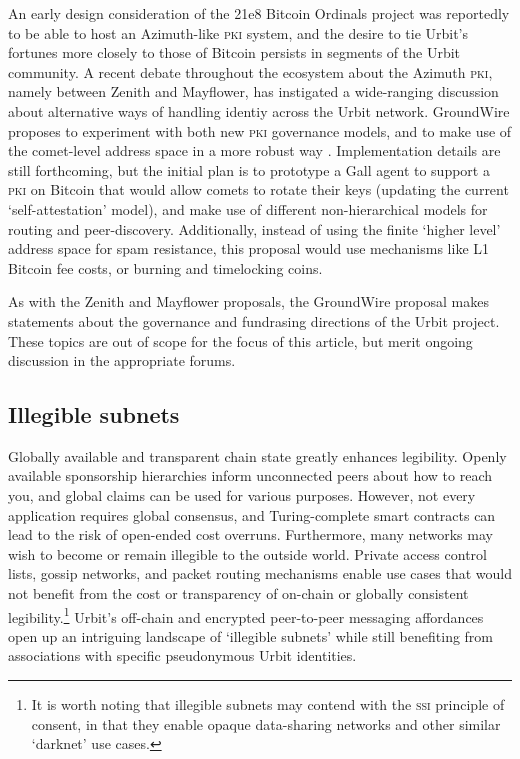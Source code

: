 \documentclass[twoside]{article}
\begin{document}
An early design consideration of the 21e8 Bitcoin Ordinals project \citep{Ordinals} was reportedly to be able to host an Azimuth-like \textsc{pki} system, and the desire to tie Urbit's fortunes more closely to those of Bitcoin persists in segments of the Urbit community. A recent debate throughout the ecosystem about the Azimuth \textsc{pki}, namely between Zenith and Mayflower, has instigated a wide-ranging discussion about alternative ways of handling identiy across the Urbit network. GroundWire proposes to experiment with both new \textsc{pki} governance models, and to make use of the comet-level address space in a more robust way \citep{Hamilton2024}. Implementation details are still forthcoming, but the initial plan is to prototype a Gall agent to support a \textsc{pki} on Bitcoin that would allow comets to rotate their keys (updating the current `self-attestation' model), and make use of different non-hierarchical models for routing and peer-discovery. Additionally, instead of using the finite `higher level' address space for spam resistance, this proposal would use mechanisms like L1 Bitcoin fee costs, or burning and timelocking coins.

As with the Zenith and Mayflower proposals, the GroundWire proposal makes statements about the governance and fundrasing directions of the Urbit project. These topics are out of scope for the focus of this article, but merit ongoing discussion in the appropriate forums.

\subsection{Illegible subnets}

Globally available and transparent chain state greatly enhances legibility. Openly available sponsorship hierarchies inform unconnected peers about how to reach you, and global claims can be used for various purposes. However, not every application requires global consensus, and Turing-complete smart contracts can lead to the risk of open-ended cost overruns.  Furthermore, many networks may wish to become or remain illegible to the outside world. Private access control lists, gossip networks, and packet routing mechanisms enable use cases that would not benefit from the cost or transparency of on-chain or globally consistent legibility.\footnote{It is worth noting that illegible subnets may contend with the \textsc{ssi} principle of consent, in that they enable opaque data-sharing networks and other similar `darknet' use cases.} Urbit's off-chain and encrypted peer-to-peer messaging affordances open up an intriguing landscape of `illegible subnets' while still benefiting from associations with specific pseudonymous Urbit identities.
\end{document}
